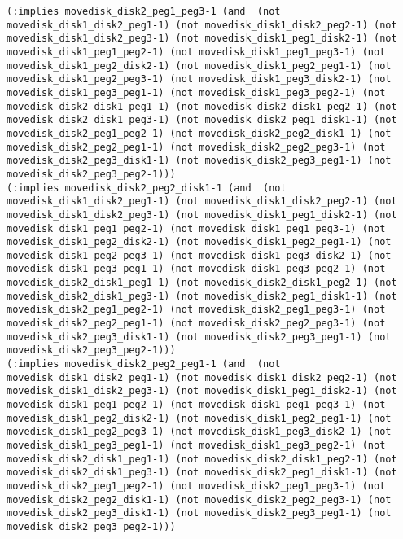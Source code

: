 \documentclass[12pt,letterpaper]{ntdhw}
\begin{document}
\begin{enumerate}
\begin{enumerate}
\begin{lstlisting}[language=pddl, style=pddlstyle,
  basicstyle=\scriptsize]
(:implies movedisk_disk2_peg1_peg3-1 (and  (not movedisk_disk1_disk2_peg1-1) (not movedisk_disk1_disk2_peg2-1) (not movedisk_disk1_disk2_peg3-1) (not movedisk_disk1_peg1_disk2-1) (not movedisk_disk1_peg1_peg2-1) (not movedisk_disk1_peg1_peg3-1) (not movedisk_disk1_peg2_disk2-1) (not movedisk_disk1_peg2_peg1-1) (not movedisk_disk1_peg2_peg3-1) (not movedisk_disk1_peg3_disk2-1) (not movedisk_disk1_peg3_peg1-1) (not movedisk_disk1_peg3_peg2-1) (not movedisk_disk2_disk1_peg1-1) (not movedisk_disk2_disk1_peg2-1) (not movedisk_disk2_disk1_peg3-1) (not movedisk_disk2_peg1_disk1-1) (not movedisk_disk2_peg1_peg2-1) (not movedisk_disk2_peg2_disk1-1) (not movedisk_disk2_peg2_peg1-1) (not movedisk_disk2_peg2_peg3-1) (not movedisk_disk2_peg3_disk1-1) (not movedisk_disk2_peg3_peg1-1) (not movedisk_disk2_peg3_peg2-1)))
(:implies movedisk_disk2_peg2_disk1-1 (and  (not movedisk_disk1_disk2_peg1-1) (not movedisk_disk1_disk2_peg2-1) (not movedisk_disk1_disk2_peg3-1) (not movedisk_disk1_peg1_disk2-1) (not movedisk_disk1_peg1_peg2-1) (not movedisk_disk1_peg1_peg3-1) (not movedisk_disk1_peg2_disk2-1) (not movedisk_disk1_peg2_peg1-1) (not movedisk_disk1_peg2_peg3-1) (not movedisk_disk1_peg3_disk2-1) (not movedisk_disk1_peg3_peg1-1) (not movedisk_disk1_peg3_peg2-1) (not movedisk_disk2_disk1_peg1-1) (not movedisk_disk2_disk1_peg2-1) (not movedisk_disk2_disk1_peg3-1) (not movedisk_disk2_peg1_disk1-1) (not movedisk_disk2_peg1_peg2-1) (not movedisk_disk2_peg1_peg3-1) (not movedisk_disk2_peg2_peg1-1) (not movedisk_disk2_peg2_peg3-1) (not movedisk_disk2_peg3_disk1-1) (not movedisk_disk2_peg3_peg1-1) (not movedisk_disk2_peg3_peg2-1)))
(:implies movedisk_disk2_peg2_peg1-1 (and  (not movedisk_disk1_disk2_peg1-1) (not movedisk_disk1_disk2_peg2-1) (not movedisk_disk1_disk2_peg3-1) (not movedisk_disk1_peg1_disk2-1) (not movedisk_disk1_peg1_peg2-1) (not movedisk_disk1_peg1_peg3-1) (not movedisk_disk1_peg2_disk2-1) (not movedisk_disk1_peg2_peg1-1) (not movedisk_disk1_peg2_peg3-1) (not movedisk_disk1_peg3_disk2-1) (not movedisk_disk1_peg3_peg1-1) (not movedisk_disk1_peg3_peg2-1) (not movedisk_disk2_disk1_peg1-1) (not movedisk_disk2_disk1_peg2-1) (not movedisk_disk2_disk1_peg3-1) (not movedisk_disk2_peg1_disk1-1) (not movedisk_disk2_peg1_peg2-1) (not movedisk_disk2_peg1_peg3-1) (not movedisk_disk2_peg2_disk1-1) (not movedisk_disk2_peg2_peg3-1) (not movedisk_disk2_peg3_disk1-1) (not movedisk_disk2_peg3_peg1-1) (not movedisk_disk2_peg3_peg2-1)))

\end{lstlisting}
\end{enumerate}
\end{enumerate}
\end{document}
